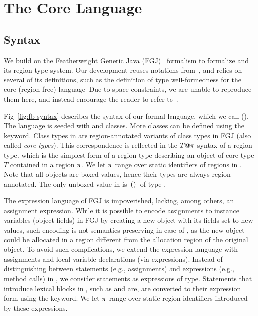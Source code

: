 \section{The Core Language}
\label{sec:type-system}






\subsection{Syntax}
\label{sec:fb-syntax}

We build on the Featherweight Generic Java (FGJ)~\cite{fgj} formalism
to formalize \name and its region type system. Our development reuses
notations from~\cite{fgj}, and relies on several of its definitions,
such as the definition of type well-formedness for the core
(region-free) language. Due to space constraints, we are unable to
reproduce them here, and instead encourage the reader to refer
to~\cite{fgj}.

Fig~\ref{fig:fb-syntax} describes the syntax of our formal language,
which we call \fbname (\FB). The language is seeded with \ObjZ and
\RgnZ classes. More classes can be defined using the 
keyword. Class types in \FB are region-annotated variants of class
types in FGJ (also called \emph{core types}). This correspondence is
reflected in the $T@\pi$ syntax of a region type, which is the
simplest form of a region type describing an object of core type $T$
contained in a region $\pi$. We let $\pi$ range over static
identifiers of regions in \FB. Note that all \FB objects are boxed
values, hence their \FB types are always region-annotated. The only
unboxed value in \FB is $\,{\tt ()}\,$ of type \unitZ.

The expression language of FGJ is impoverished, lacking, among others,
an assignment expression. While it is possible to encode
assignments to instance variables (object fields) in FGJ by creating a
new object with its fields set to new values, such encoding is not
semantics preserving in case of \name, as the new object could be
allocated in a region different from the allocation region of the
original object. To avoid such complications, we extend the expression
language with assignments and local variable declarations (via 
expressions). Instead of distinguishing between statements (e.g.,
assignments) and expressions (e.g., method calls) in \FB, we consider
statements as expressions of \unitZ type.  Statements that introduce
lexical blocks in \name, such as  and  are, are
converted to their expression form using the  keyword. We let
$\pi$ range over static region identifiers introduced by these
expressions.

